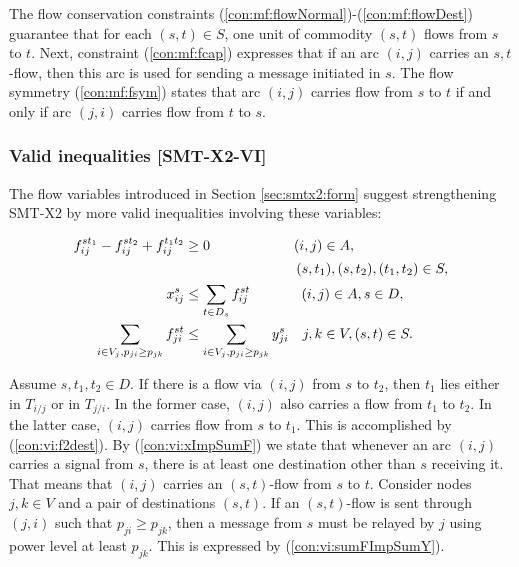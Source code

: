 The flow conservation constraints (\ref{con:mf:flowNormal})-(\ref{con:mf:flowDest}) guarantee that for each $(s,t)\in S$, one unit of commodity $(s,t)$ flows from $s$ to $t$. Next, constraint (\ref{con:mf:fcap}) expresses that if an arc $(i,j)$ carries an $s,t$-flow, then this arc is used for sending a message initiated in $s$. The flow symmetry (\ref{con:mf:fsym}) states that arc $(i,j)$ carries flow from $s$ to $t$ if and only if arc $(j,i)$ carries flow from $t$ to $s$.

\subsubsection{Valid inequalities [SMT-X2-VI]}

The flow variables introduced in Section \ref{sec:smtx2:form} suggest strengthening SMT-X2 by more valid inequalities involving these variables:

  \begin{subequations}[resume]
  \begin{flalign}
\label{con:vi:f2dest}  f^{st_1}_{ij}-f^{st_2}_{ij}+f^{t_1t_2}_{ij} & \geq 0 \quad\quad\quad\quad\quad\quad (i,j) \in A, \\  & \notag\quad\quad\quad\quad\quad\quad\quad\quad(s,t_1),(s,t_2),(t_1,t_2)\in S, \\
\label{con:vi:xImpSumF} x^{s}_{ij} & \leq \sum\limits_{t\in D_s}  f^{st}_{ij}   \quad\quad ~~~~~  (i,j)\in A, s\in D, \\
\label{con:vi:sumFImpSumY} \sum\limits_{i\in V_j, p_{ji}\geq p_{jk}}f^{st}_{ji} & \leq \sum\limits_{i\in V_j, p_{ji}\geq p_{jk}}  y^{s}_{ji} ~~~  j,k\in V, (s,t)\in S.
\end{flalign}
  \end{subequations}
  
Assume $s,t_1,t_2\in D$. If there is a flow via $(i,j)$ from $s$ to $t_2$, then $t_1$ lies either in $T_{i/j}$ or in $T_{j/i}$. In the former case, $(i,j)$ also carries a flow from $t_1$ to $t_2$. In the latter case, $(i,j)$ carries flow from $s$ to $t_1$. This is accomplished by (\ref{con:vi:f2dest}). By (\ref{con:vi:xImpSumF}) we state that whenever an arc $(i,j)$ carries a signal from $s$, there is at least one destination other than $s$ receiving it. That means that $(i,j)$ carries an $(s,t)$-flow from $s$ to $t$.  Consider nodes $j,k\in V$ and a pair of destinations $(s,t)$. If an $(s,t)$-flow is sent through $(j,i)$ such that $p_{ji}\geq p_{jk}$, then a message from $s$ must be relayed by $j$ using power level at least $p_{jk}$. This is expressed by (\ref{con:vi:sumFImpSumY}).
